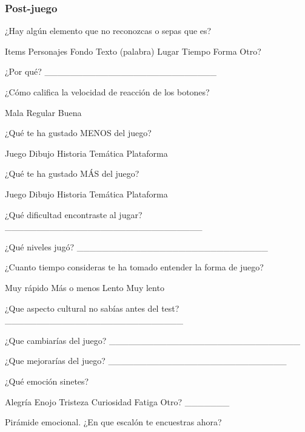 \subsubsection{Post-juego}
\begin{questions}
	
	{%
	\checkboxchar{$\Box$} %
	\question ¿Hay algún elemento que no reconozcas  o sepas que es?
	\begin{checkboxes}
		\choice Items
		\choice Personajes
		\choice Fondo
		\choice Texto (palabra)
		\choice Lugar
		\choice Tiempo
		\choice Forma
		\choice Otro?
	\end{checkboxes}
}%
	
	\question ¿Por qué?
	___________________________
	
	\question ¿Cómo califica la velocidad de reacción de los botones?
	\begin{checkboxes}
		\choice Mala
		\choice Regular
		\choice Buena
	\end{checkboxes}

	\question ¿Qué te ha gustado MENOS del juego?
	\begin{checkboxes}
		\choice Juego
		\choice Dibujo
		\choice Historia
		\choice Temática
		\choice Plataforma
	\end{checkboxes}
	
	\question ¿Qué te ha gustado MÁS del juego?
\begin{checkboxes}
	\choice Juego
	\choice Dibujo
	\choice Historia
	\choice Temática
	\choice Plataforma
\end{checkboxes}

	\question ¿Qué dificultad encontraste al jugar?
	_______________________________
	
	\question ¿Qué niveles jugó?
	______________________________
	
	\question ¿Cuanto tiempo consideras te ha tomado entender la forma de juego? 
		\begin{checkboxes}
		\choice Muy rápido
		\choice Más o menos
		\choice Lento
		\choice Muy lento
	\end{checkboxes}

	\question ¿Que aspecto cultural no sabías antes del test?
	____________________________
	
	\question ¿Que cambiarías del juego?
	______________________________
	
	\question ¿Que mejorarías del juego?
	____________________________

	\question ¿Qué emoción sinetes? 
	\begin{checkboxes}
		\choice Alegría
		\choice Enojo
		\choice Tristeza
		\choice Curiosidad
		\choice Fatiga
		\choice Otro? _______
	\end{checkboxes}


	\question Pirámide emocional. ¿En que escalón te encuestras ahora?
	


\end{questions}

